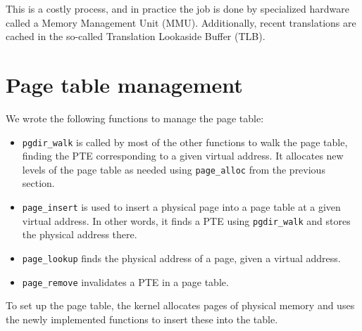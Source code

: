 \documentclass{report}
\begin{document}
This is a costly process, and in practice the job is done by specialized
hardware called a Memory Management Unit (MMU). Additionally, recent
translations are cached in the so-called Translation Lookaside Buffer
(TLB).


\section{Page table management}
\label{sec:pagetables}
We wrote the following functions to manage the page table:
\begin{itemize}
\item \texttt{pgdir\_walk} is called by most of the other functions to walk the
page table, finding the PTE corresponding to a given virtual address. It
allocates new levels of the page table as needed using \texttt{page\_alloc}
from the previous section.
\item \texttt{page\_insert} is used to insert a physical page into a page
table at a given virtual address. In other words, it finds a PTE using
\texttt{pgdir\_walk} and stores the physical address there.
\item \texttt{page\_lookup} finds the physical address of a page, given a
virtual address.
\item \texttt{page\_remove} invalidates a PTE in a page table.
\end{itemize}
To set up the page table, the kernel allocates pages of physical memory and
uses the newly implemented functions to insert these into the table.
\end{document}
